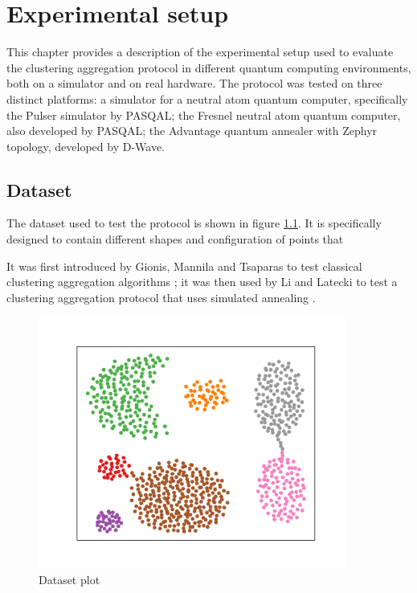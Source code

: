 \chapter{Experimental setup}
This chapter provides a description of the experimental setup used to evaluate the clustering aggregation protocol in different quantum computing environments, both on a simulator and on real hardware. The protocol was tested on three distinct platforms: a simulator for a neutral atom quantum computer, specifically the Pulser simulator by PASQAL; the Fresnel neutral atom quantum computer, also developed by PASQAL; the Advantage quantum annealer with Zephyr topology, developed by D-Wave.

\section{Dataset}
The dataset used to test the protocol is shown in figure \ref{fig:dataset}. It is specifically designed to contain different shapes and configuration of points that  

It was first introduced by Gionis, Mannila and Tsaparas to test classical clustering aggregation algorithms \cite{dataset}; it was then used by Li and Latecki to test a clustering aggregation protocol that uses simulated annealing \cite{aggregation}. 

\begin{figure}[ht]
  \centering 
  \includegraphics[width=0.9\textwidth]{figures/03experimental_setup/dataset.pdf}
  \caption{Dataset plot}
  \label{fig:dataset}
\end{figure}

